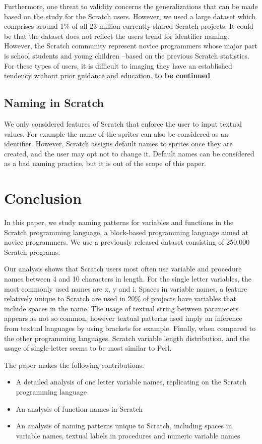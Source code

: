 \documentclass[conference]{IEEEtran}
\newcommand{\todo}[1]{ \textbf{#1} }
\begin{document}
Furthermore, one threat to validity concerns the generalizations that can be made based on the study for the Scratch users.  However, we used a large dataset which comprises around 1\% of all 23 million currently shared Scratch projects. It could be that the dataset does not reflect the users trend for identifier naming. However, the Scratch community represent novice programmers whose major part is school students and young children --based on the previous Scratch statistics. For these types of users, it is difficult to imaging they have an established tendency without prior guidance and education. 
\todo{to be continued}

\subsection{Naming in Scratch}
We only considered features of Scratch that enforce the user to input textual values. For example the name of the sprites can also be considered as an identifier. However, Scratch assigns default names to sprites once they are created, and the user may opt not to change it. Default names can be considered as a bad naming practice, but it is out of the scope of this paper.\\

\section{Conclusion}
In this paper, we study naming patterns for variables and functions in the Scratch programming language, a block-based programming language aimed at novice programmers. We use a previously released dataset consisting of 250.000 Scratch programs. 

Our analysis shows that Scratch users most often use variable and procedure names between 4 and 10 characters in length. For the single letter variables, the most commonly used names are x, y and i. Spaces in variable names, a feature relatively unique to Scratch are used in 20\% of projects have variables that include spaces in the name. The usage of textual string between parameters appears as not so common, however textual patterns used imply an inference from textual languages by using brackets for example. Finally, when compared to the other programming languages, Scratch variable length distribution, and the usage of single-letter seems to be most similar to Perl.

The paper makes the following contributions:

\begin{itemize}
\item A detailed analysis of one letter variable names, replicating \cite{Beniamini} on the Scratch programming language
\item An analysis of function names in Scratch
\item An analysis of naming patterns unique to Scratch, including spaces in variable names, textual labels in procedures and numeric variable names
\end{itemize}
\end{document}
